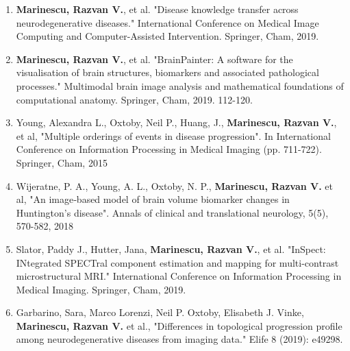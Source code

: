 \documentclass[11pt]{article}
\begin{document}


\vspace{-7em}
\begin{enumerate}
 \item \textbf{Marinescu, Razvan V.}, et al. "Disease knowledge transfer across neurodegenerative diseases." International Conference on Medical Image Computing and Computer-Assisted Intervention. Springer, Cham, 2019.
 \item \textbf{Marinescu, Razvan V.}, et al. "BrainPainter: A software for the visualisation of brain structures, biomarkers and associated pathological processes." Multimodal brain image analysis and mathematical foundations of computational anatomy. Springer, Cham, 2019. 112-120.
 \item Young, Alexandra L., Oxtoby, Neil P., Huang, J., \textbf{Marinescu, Razvan V.},  et al, "Multiple orderings of events in disease progression". In International Conference on Information Processing in Medical Imaging (pp. 711-722). Springer, Cham, 2015
 \item Wijeratne, P. A., Young, A. L., Oxtoby, N. P., \textbf{Marinescu, Razvan V.} et al, "An image‐based model of brain volume biomarker changes in Huntington's disease". Annals of clinical and translational neurology, 5(5), 570-582, 2018
 \item Slator, Paddy J., Hutter, Jana, \textbf{Marinescu, Razvan V.}, et al. "InSpect: INtegrated SPECTral component estimation and mapping for multi-contrast microstructural MRI." International Conference on Information Processing in Medical Imaging. Springer, Cham, 2019.
 \item Garbarino, Sara, Marco Lorenzi, Neil P. Oxtoby, Elisabeth J. Vinke, \textbf{Marinescu, Razvan V.} et al., "Differences in topological progression profile among neurodegenerative diseases from imaging data." Elife 8 (2019): e49298.
\end{enumerate}


\pagebreak
\end{document}
